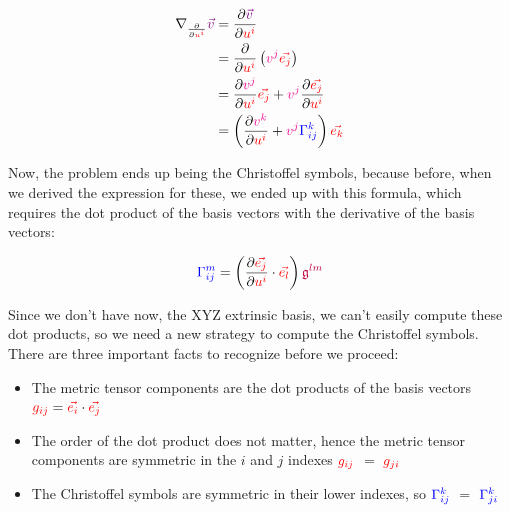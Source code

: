 \begin{align*}
    \nabla_{\frac{\partial}{\partial \begingroup\color{red}u^i\endgroup}}\begingroup\color{violet}\vec{v}\endgroup &= 
    \frac{\partial \begingroup\color{violet}\vec{v}\endgroup}{\partial \begingroup\color{red}u^i\endgroup}\\
    &= \frac{\partial}{\partial \begingroup\color{red}u^i\endgroup} \left(\begingroup\color{magenta}v^j\endgroup \begingroup\color{red}\vec{e_j}\endgroup\right)\\
    &= \frac{\partial \begingroup\color{magenta}v^j\endgroup}{\partial \begingroup\color{red}u^i\endgroup} \begingroup\color{red}\vec{e_j}\endgroup + \begingroup\color{magenta}v^j\endgroup \frac{\partial \begingroup\color{red}\vec{e_j}\endgroup}{\partial \begingroup\color{red}u^i\endgroup}\\
    &= \left(\frac{\partial \begingroup\color{magenta}v^k\endgroup}{\partial \begingroup\color{red}u^i\endgroup} + \begingroup\color{magenta}v^j\endgroup \begingroup\color{blue}\Gamma^k_{ij}\endgroup\right)\begingroup\color{red}\vec{e_k}\endgroup
\end{align*}

Now, the problem ends up being the Christoffel symbols, because before, when we derived the expression for these, we ended up with this formula, 
which requires the dot product of the basis vectors with the derivative of the basis vectors:

\begin{equation}
    \begingroup\color{blue}\Gamma^{m}_{ij}\endgroup = \left(\frac{\partial \begingroup\color{red}\vec{e_j}\endgroup}{\partial \begingroup\color{red}u^i\endgroup } \cdot \begingroup\color{red}\vec{e_l}\endgroup\right) \begingroup\color{purple}\mathfrak{g}^{lm}\endgroup
\end{equation}

Since we don't have now, the XYZ extrinsic basis, we can't easily compute these dot products, so we need a new strategy to compute the Christoffel symbols.\\
There are three important facts to recognize before we proceed:

\begin{itemize}
    \item The metric tensor components are the dot products of the basis vectors $\begingroup\color{red}g_{ij}\endgroup = \begingroup\color{red}\vec{e_i}\endgroup \cdot \begingroup\color{red}\vec{e_j}\endgroup$
    \item The order of the dot product does not matter, hence the metric tensor components are symmetric in the $i$ and $j$ indexes $\color{red}g_{ij}$ $=$ $\color{red}g_{ji}$ 
    \item The Christoffel symbols are symmetric in their lower indexes, so $\color{blue}\Gamma_{ij}^k$ $=$ $\color{blue}\Gamma_{ji}^k$
\end{itemize}

